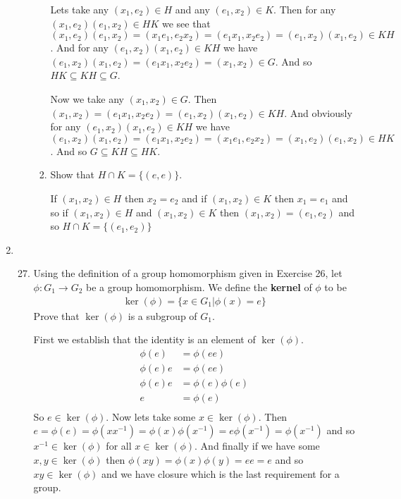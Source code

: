 \documentclass[letterpaper]{article}
\begin{document}
\begin{enumerate}
\begin{enumerate}
\begin{enumerate}
      Lets take any $(x_1,e_2)\in H$ and any $(e_1,x_2)\in K$.
      Then for any $(x_1,e_2)(e_1,x_2)\in HK$ we see that $(x_1,e_2)(e_1,x_2)=(x_1e_1,e_2x_2)=(e_1x_1,x_2e_2)=(e_1,x_2)(x_1,e_2)\in KH$.
      And for any  $(e_1,x_2)(x_1,e_2)\in KH$ we have $(e_1,x_2)(x_1,e_2)=(e_1x_1,x_2e_2)=(x_1,x_2)\in G$.
      And so $HK\subseteq KH\subseteq G$.

      Now we take any $(x_1,x_2)\in G$.
      Then $(x_1,x_2)=(e_1x_1,x_2e_2)=(e_1,x_2)(x_1,e_2)\in KH$.
      And obviously for any $(e_1,x_2)(x_1,e_2)\in KH$ we have $(e_1,x_2)(x_1,e_2)=(e_1x_1,x_2e_2)=(x_1e_1,e_2x_2)=(x_1,e_2)(e_1,x_2)\in HK$.
      And so $G\subseteq KH\subseteq HK$.
    \item
      Show that $H\cap K=\{(e,e)\}$.

      If $(x_1,x_2)\in H$ then $x_2=e_2$ and if $(x_1,x_2)\in K$ then $x_1=e_1$ and so if $(x_1,x_2)\in H$ and $(x_1,x_2)\in  K$ then $(x_1,x_2)=(e_1,e_2)$ and so $H\cap K=\{(e_1,e_2)\}$
    \end{enumerate}
  \end{enumerate}
\item
  \begin{enumerate}
  \setcounter{enumii}{26}
  \item
    Using the definition of a group homomorphism given in Exercise 26, let $\phi:G_1\to G_2$ be a group homomorphism. We define the {\bfseries kernel} of $\phi$ to be
    \begin{align*}
      \ker(\phi)=\{x\in G_1|\phi(x)=e\}
    \end{align*}
    Prove that $\ker(\phi)$ is a subgroup of $G_1$.

    First we establish that the identity is an element of $\ker(\phi)$.
    \begin{align*}
      \phi(e)&=\phi(ee)\\
      \phi(e)e&=\phi(ee)\\
      \phi(e)e&=\phi(e)\phi(e)\\
      e&=\phi(e)\\
    \end{align*}
    So $e\in \ker(\phi)$.
    Now lets take some $x\in \ker(\phi)$.
    Then $e=\phi(e)=\phi(xx^{-1})=\phi(x)\phi(x^{-1})=e\phi(x^{-1})=\phi(x^{-1})$ and so $x^{-1}\in \ker(\phi)$ for all $x\in \ker(\phi)$. And finally if we have some $x,y\in \ker(\phi)$ then $\phi(xy)=\phi(x)\phi(y)=ee=e$ and so $xy\in \ker(\phi)$ and we have closure which is the last requirement for a group.
  \end{enumerate}
\end{enumerate}
\end{document}
